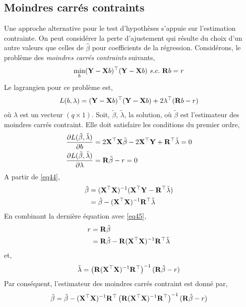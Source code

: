 \subsection{Moindres carrés contraints}
Une approche alternative pour le test d'hypothèses s'appuie sur l'estimation contrainte. On peut considérer la perte d'ajustement qui résulte du choix d'un autre valeurs que celles de $\hat{\beta}$ pour coefficients de la régression. Considérons, le problème des \emph{moindres carrés contraints} suivants,
\begin{align*}
\min_b(\mathbf Y-\mathbf X b)^\top (\mathbf Y-\mathbf X b) \ s.c. \ \mathbf{R}b=r
\end{align*}
Le lagrangien pour ce problème est,
\begin{align*}
L(b, \lambda) = (\mathbf Y-\mathbf X b)^\top (\mathbf Y-\mathbf X b) + 2\lambda^\top(\mathbf{R}b-r)
\end{align*}
où $\lambda$ est un vecteur $(q\times 1)$. Soit, $\tilde{\beta}$, $\tilde{\lambda}$, la solution, où $\tilde{\beta}$ est l'estimateur des moindres carrés contraint. Elle doit satisfaire les conditions du premier ordre,
\begin{align}
\frac{\partial L(\tilde{\beta}, \tilde{\lambda})}{\partial b} &= 2\mathbf X^\top\mathbf X\tilde{\beta} - 2\mathbf X^\top\mathbf Y + \mathbf{R}^\top\tilde{\lambda} = 0
\label{eq44}\\
\frac{\partial L(\tilde{\beta}, \tilde{\lambda})}{\partial \lambda} &=\mathbf{R}\tilde{\beta} -r = 0
\label{eq45}
\end{align}
A partir de \eqref{eq44},
\begin{align*}
\tilde{\beta} & = (\mathbf X^\top\mathbf X)^{-1}(\mathbf X^\top\mathbf Y - \mathbf{R}^\top\tilde{\lambda})\\
&=\hat{\beta} - (\mathbf X^\top\mathbf X)^{-1}\mathbf{R}^\top\tilde{\lambda}
\end{align*}
En combinant la dernière équation avec \eqref{eq45},
\begin{align*}
r &=\mathbf{R}\tilde{\beta}\\
&=\mathbf{R}\hat{\beta} - \mathbf{R}(\mathbf X^\top\mathbf X)^{-1}\mathbf{R}^\top\tilde{\lambda} 
\end{align*}
et,
\begin{align*}
\tilde{\lambda} = \left(\mathbf{R}(\mathbf X^\top\mathbf X)^{-1}\mathbf{R}^\top\right)^{-1}(\mathbf{R}\hat{\beta}-r)
\end{align*}
Par conséquent, l'estimateur des moindres carrés contraint est donné par,
\begin{align*}
\tilde{\beta} = \hat{\beta} - (\mathbf X^\top\mathbf X)^{-1}\mathbf{R}^\top\left(\mathbf{R}(\mathbf X^\top\mathbf X)^{-1}\mathbf{R}^\top\right)^{-1}(\mathbf{R}\hat{\beta}-r)
\end{align*}
